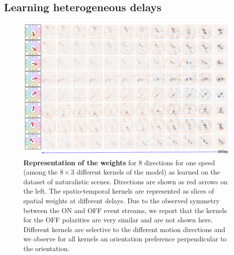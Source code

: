 \documentclass[landscape,a0]{a0poster}
\newcommand{\colorsubsec}{gray}
\begin{document}
\begin{multicols}{3}
\subsection*{\color{\colorsubsec}Learning heterogeneous delays}
%
\vspace{-1cm}
\begin{figure}[H]
    \centering
    \includegraphics[width=.8\linewidth]{figures/motion_kernels.pdf}
    \caption{
    	\textbf{Representation of the weights} for $8$ directions for one speed (among the $8 \times 3$ different kernels of the model) as learned on the dataset of naturalistic scenes. Directions are shown as red arrows on the left. The spatio-temporal kernels are represented as slices of spatial weights at different delays. Due to the observed symmetry between the ON and OFF event streams, we report that the kernels for the OFF polarities are very similar and are not shown here. Different kernels are selective to the different motion directions and we observe for all kernels an orientation preference perpendicular to the orientation. 
	}
    \label{fig:kernels}
\end{figure} 

\end{multicols}
\end{document}
